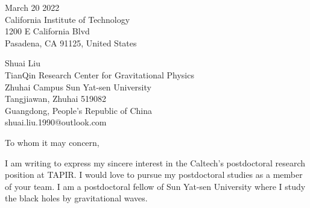 \documentclass[11pt,a4paper,sans]{letter} %
\date{}
\begin{document}

\begin{letter}{March 20 2022 \\
California Institute of Technology \\
1200 E California Blvd \\ 
Pasadena, CA 91125, United States}

Shuai Liu \\
TianQin Research Center for Gravitational Physics \\
Zhuhai Campus Sun Yat-sen University \\
Tangjiawan, Zhuhai 519082 \\
Guangdong, People's Republic of China \\
shuai.liu.1990@outlook.com








\opening{To whom it may concern,} 
 
I am writing to express my sincere interest in the Caltech's postdoctoral research position at TAPIR. I would love to
pursue my postdoctoral studies as a member of your team. I am a postdoctoral fellow of Sun Yat-sen University where
I study the black holes by gravitational waves.


\end{letter}
\end{document}
